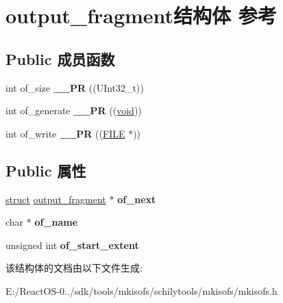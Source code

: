 \hypertarget{structoutput__fragment}{}\section{output\+\_\+fragment结构体 参考}
\label{structoutput__fragment}
\subsection*{Public 成员函数}
\begin{DoxyCompactItemize}
\item 
\mbox{\label{structoutput__fragment_acf5a7dc66173eb66af4b872ec4bebf3a}} 
int of\+\_\+size {\bfseries \+\_\+\+\_\+\+PR} ((U\+Int32\+\_\+t))
\item 
\mbox{\label{structoutput__fragment_af68f454f7df0d1a0a8d12f99d7471fc0}} 
int of\+\_\+generate {\bfseries \+\_\+\+\_\+\+PR} ((\hyperlink{interfacevoid}{void}))
\item 
\mbox{\label{structoutput__fragment_afc369cf07459924afc5b6e4e792aeee9}} 
int of\+\_\+write {\bfseries \+\_\+\+\_\+\+PR} ((\hyperlink{struct__iobuf}{F\+I\+LE} $\ast$))
\end{DoxyCompactItemize}
\subsection*{Public 属性}
\begin{DoxyCompactItemize}
\item 
\mbox{\label{structoutput__fragment_af3669956bc30a24ba9fa225d483be1c8}} 
\hyperlink{interfacestruct}{struct} \hyperlink{structoutput__fragment}{output\+\_\+fragment} $\ast$ {\bfseries of\+\_\+next}
\item 
\mbox{\label{structoutput__fragment_aa3f14bfe20c7a11d12b82eadc4c9fd75}} 
char $\ast$ {\bfseries of\+\_\+name}
\item 
\mbox{\label{structoutput__fragment_a70819aa48c2d9912260124327f914a3f}} 
unsigned int {\bfseries of\+\_\+start\+\_\+extent}
\end{DoxyCompactItemize}


该结构体的文档由以下文件生成\+:\begin{DoxyCompactItemize}
\item 
E\+:/\+React\+O\+S-\/0../sdk/tools/mkisofs/schilytools/mkisofs/mkisofs.\+h\end{DoxyCompactItemize}
